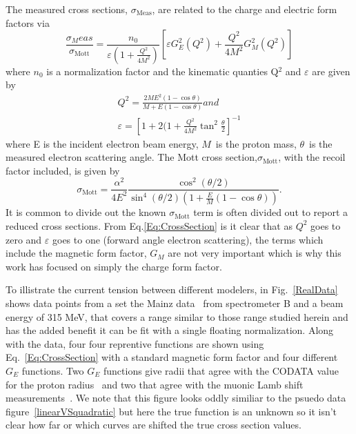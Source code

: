 \documentclass[10pt,aps,prc,twocolumn]{revtex4-1}
\begin{document}
The measured cross sections, $\sigma_{\mathrm{Meas}}$,  are related to the charge and electric form factors via 
\begin{equation}
\frac{\sigma_Meas}{\sigma_{\text{Mott}}} = \frac{n_0}{\varepsilon (1 + \frac{Q^2}{4M^2})} \left[\varepsilon G_E^2 (Q^2) + \frac{Q^2}{4M^2} G_M^2 (Q^2)\right]
\label{Eq:CrossSection}
\end{equation}
where $n_0$ is a normalization factor and the kinematic quanties Q$^2$ and $\varepsilon$ are given by
\begin{gather}
Q^2 = \frac{2M E^2 (1 - \cos{\theta})}{M + E (1 - \cos{\theta})} and \\
\varepsilon = \left[1 + 2(1 + \frac{Q^2}{4M^2}  \tan^2{\frac{\theta}{2}}\right]^{-1}
\end{gather}
where E is the incident electron beam energy, $M$~is the proton mass, $\theta$~is the measured electron scattering angle. 
The Mott cross section,$\sigma_{\text{Mott}}$, with the recoil factor included, is given by
\begin{equation}
\sigma_{\text{Mott}}  = \frac{\alpha^2}{4 E^2} \frac{\cos^2{(\theta / 2)}}{\sin^4{(\theta / 2)} ( 1 + \frac{E}{M} (1 - \cos{\theta}))}.
\end{equation}
It is common to divide out the known $\sigma_{\text{Mott}}$ term is often divided out to report a reduced cross sections.
From Eq.\ref{Eq:CrossSection} is it clear that as $Q^2$ goes to zero and $\varepsilon$ goes to one (forward angle electron scattering), 
the terms which include the  magnetic form factor, $G_M$ are not very important which is why this work has
focused on simply the charge form factor.

To illistrate the current tension between different modelers, in Fig.~\ref{RealData} shows 
data points from a set the Mainz data~\cite{Bernauer:2013tpr} from spectrometer B and a beam energy of 315 MeV, 
that covers a range similar to those range studied herein and has the added benefit it can be fit with a single floating normalization.   
Along with the data, four four reprentive functions are shown using Eq.~\ref{Eq:CrossSection} with a standard magnetic form factor and
four different $G_E$ functions.   Two $G_E$ functions give radii that agree with the CODATA value for the proton
radius~\cite{Bernauer:2013tpr,Ye:2017gyb} and two that agree with the muonic Lamb shift measurements~\cite{Higinbotham:2015rja,Griffioen:2015hta}.
We note that this figure looks oddly similiar to the psuedo data figure~\ref{linearVSquadratic} but here the true function is an unknown 
so it isn't clear how far or which curves are shifted the true cross section values.
\end{document}
